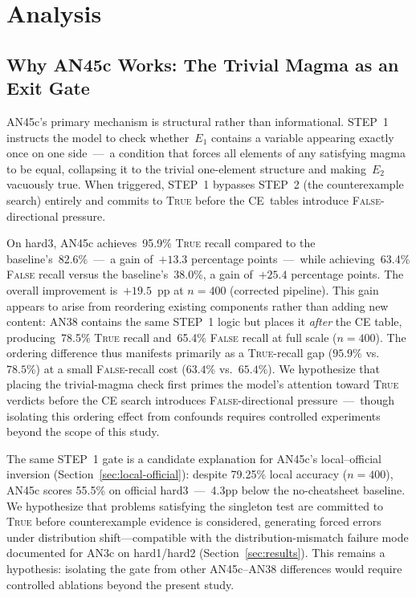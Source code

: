 \documentclass[11pt]{article}
\begin{document}
\section{Analysis}
\label{sec:analysis}

\subsection{Why AN45c Works: The Trivial Magma as an Exit Gate}

AN45c's primary mechanism is structural rather than informational.
STEP~1 instructs the model to check whether~$E_1$ contains a variable
appearing exactly once on one side~---~a condition that forces all
elements of any satisfying magma to be equal, collapsing it to the
trivial one-element structure and making~$E_2$ vacuously true. When
triggered, STEP~1 bypasses STEP~2 (the counterexample search) entirely
and commits to \textsc{True} before the CE~tables introduce
\textsc{False}-directional pressure.

On hard3, AN45c achieves~95.9\% \textsc{True} recall compared to the
baseline's~82.6\%~---~a gain of~$+13.3$ percentage points~---~while
achieving~63.4\% \textsc{False} recall versus the baseline's~38.0\%,
a gain of~$+25.4$ percentage points.
The overall improvement is~$+19.5$~pp at $n=400$ (corrected pipeline).
This gain appears to arise from reordering existing components rather
than adding new content: AN38 contains the same STEP~1 logic but places
it \emph{after} the CE table, producing~78.5\% \textsc{True}
recall and~65.4\% \textsc{False} recall at full scale ($n=400$).
The ordering difference thus manifests primarily as a
\textsc{True}-recall gap ($95.9\%$ vs.\ $78.5\%$) at a small
\textsc{False}-recall cost ($63.4\%$ vs.\ $65.4\%$). We hypothesize
that placing the trivial-magma check first primes the model's attention
toward \textsc{True} verdicts before the CE search introduces
\textsc{False}-directional pressure~---~though isolating this ordering
effect from confounds requires controlled experiments beyond the scope
of this study.

The same STEP~1 gate is a candidate explanation for AN45c's
local--official inversion (Section~\ref{sec:local-official}): despite
79.25\% local accuracy ($n=400$), AN45c scores 55.5\% on official
hard3~---~4.3pp below the no-cheatsheet baseline. We hypothesize that
problems satisfying the singleton test are committed to \textsc{True}
before counterexample evidence is considered, generating forced errors
under distribution shift---compatible with the distribution-mismatch
failure mode documented for AN3c on hard1/hard2
(Section~\ref{sec:results}). This remains a hypothesis: isolating the
gate from other AN45c--AN38 differences would require controlled
ablations beyond the present study.
\end{document}

